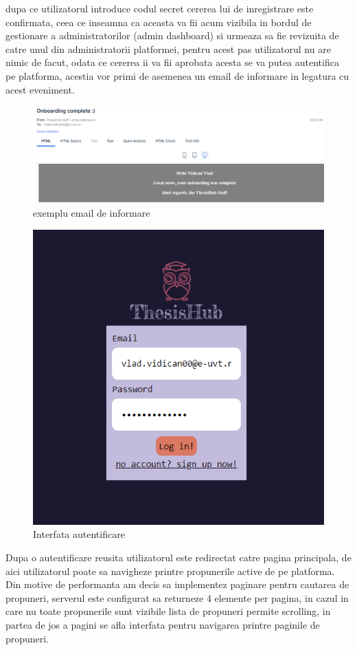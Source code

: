 \documentclass[12pt,a4paper,hidelinks]{report}
\theoremstyle{definition}
\theoremstyle{remark}
\begin{document}
dupa ce utilizatorul introduce codul secret cererea lui de inregistrare este confirmata, 
ceea ce inseamna ca aceasta va fii acum vizibila in bordul de gestionare a administratorilor (admin dashboard)
si urmeaza sa fie revizuita de catre unul din administratorii platformei, pentru acest pas utilizatorul nu are nimic de facut,
odata ce cererea ii va fii aprobata acesta  se va putea autentifica pe platforma, acestia 
vor primi de asemenea un email de informare in legatura cu acest eveniment.
\begin{figure}[H]
    \centering
    \includegraphics[scale=0.5]{images/OnboardingComplete.PNG}
    \caption{exemplu email de informare}
\end{figure}
\begin{figure}[H]
    \centering
    \includegraphics[scale=0.5]{images/LoginForm.PNG}
    \caption{Interfata autentificare}
\end{figure}
Dupa o autentificare reusita utilizatorul este redirectat catre pagina principala, 
de aici utilizatorul poate sa navigheze printre propunerile active de pe platforma.
Din motive de performanta am decis sa implementez paginare pentru cautarea de propuneri,
serverul este configurat sa returneze 4 elemente per pagina, in cazul in care nu toate propunerile sunt vizibile 
lista de propuneri permite scrolling, in partea de jos a pagini se afla interfata pentru navigarea printre paginile de propuneri. 
\end{document}

